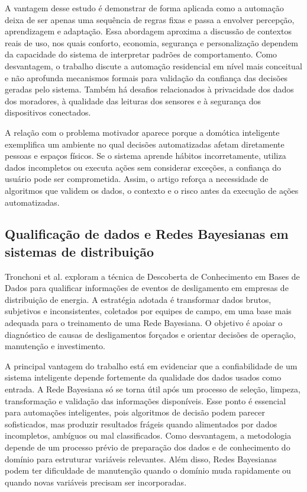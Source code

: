 \documentclass[12pt]{article}
\begin{document}
A vantagem desse estudo é demonstrar de forma aplicada como a automação deixa de ser apenas uma sequência de regras fixas e passa a envolver percepção, aprendizagem e adaptação. Essa abordagem aproxima a discussão de contextos reais de uso, nos quais conforto, economia, segurança e personalização dependem da capacidade do sistema de interpretar padrões de comportamento. Como desvantagem, o trabalho discute a automação residencial em nível mais conceitual e não aprofunda mecanismos formais para validação da confiança das decisões geradas pelo sistema. Também há desafios relacionados à privacidade dos dados dos moradores, à qualidade das leituras dos sensores e à segurança dos dispositivos conectados.

A relação com o problema motivador aparece porque a domótica inteligente exemplifica um ambiente no qual decisões automatizadas afetam diretamente pessoas e espaços físicos. Se o sistema aprende hábitos incorretamente, utiliza dados incompletos ou executa ações sem considerar exceções, a confiança do usuário pode ser comprometida. Assim, o artigo reforça a necessidade de algoritmos que validem os dados, o contexto e o risco antes da execução de ações automatizadas.

\subsection{Qualificação de dados e Redes Bayesianas em sistemas de distribuição}

Tronchoni et al. \cite{tronchoni2010} exploram a técnica de Descoberta de Conhecimento em Bases de Dados para qualificar informações de eventos de desligamento em empresas de distribuição de energia. A estratégia adotada é transformar dados brutos, subjetivos e inconsistentes, coletados por equipes de campo, em uma base mais adequada para o treinamento de uma Rede Bayesiana. O objetivo é apoiar o diagnóstico de causas de desligamentos forçados e orientar decisões de operação, manutenção e investimento.

A principal vantagem do trabalho está em evidenciar que a confiabilidade de um sistema inteligente depende fortemente da qualidade dos dados usados como entrada. A Rede Bayesiana só se torna útil após um processo de seleção, limpeza, transformação e validação das informações disponíveis. Esse ponto é essencial para automações inteligentes, pois algoritmos de decisão podem parecer sofisticados, mas produzir resultados frágeis quando alimentados por dados incompletos, ambíguos ou mal classificados. Como desvantagem, a metodologia depende de um processo prévio de preparação dos dados e de conhecimento do domínio para estruturar variáveis relevantes. Além disso, Redes Bayesianas podem ter dificuldade de manutenção quando o domínio muda rapidamente ou quando novas variáveis precisam ser incorporadas.
\end{document}
